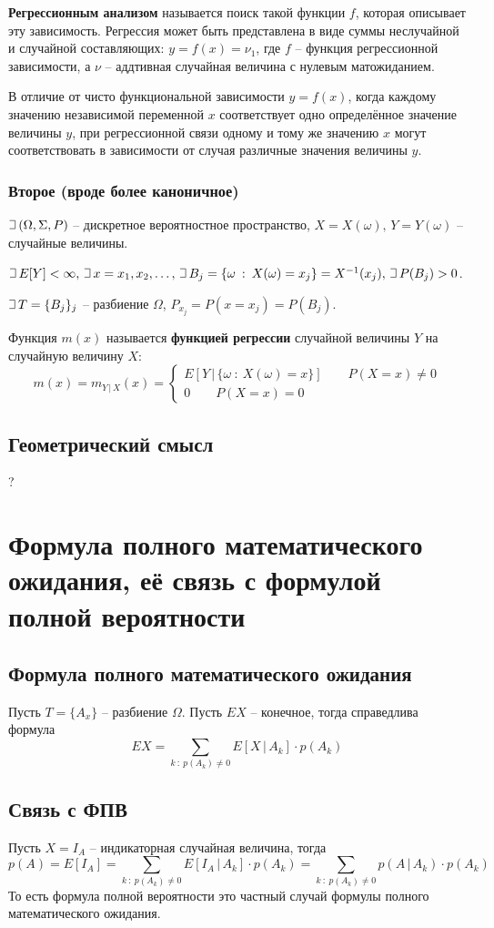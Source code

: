 \documentclass{article}
\def\letus{%
    \mathord{\setbox0=\hbox{$\exists$}%
             \hbox{\kern 0.125\wd0%
                   \vbox to \ht0{%
                      \hrule width 0.75\wd0%
                      \vfill%
                      \hrule width 0.75\wd0}%
                   \vrule height \ht0%
                   \kern 0.125\wd0}%
           }%
}
\begin{document}
\textbf{Регрессионным анализом}
называется поиск такой функции $f$, которая описывает эту зависимость. Регрессия может быть представлена в виде суммы неслучайной и случайной составляющих: $y=f(x)=\nu_1$, где $f$ -- функция регрессионной зависимости, а $\nu$ -- аддтивная случайная величина с нулевым матожиданием.

В отличие от чисто функциональной зависимости $y=f(x)$, когда каждому значению независимой переменной $x$ соответствует одно определённое значение величины $y$, при регрессионной связи одному и тому же значению $x$ могут соответствовать в зависимости от случая различные значения величины $y$.

\subsubsection{Второе (вроде более каноничное)}
$\letus \,(\Omega,\Sigma,P)$ -- дискретное вероятностное пространство, $X=X(\omega),\,Y=Y(\omega)$ -- случайные величины.

$\letus\, E[Y]<\infty,\,\letus\, x=x_1,x_2,\dots,\,\letus\,B_j=\{\omega\::\:X(\omega)=x_j\}=X^{-1}(x_j),\,\letus\,P(B_j)>0$.

$\letus\,T=\{B_j\}_j$ -- разбиение $\Omega$, $P_{x_j}=P(x=x_j)=P(B_j)$.

Функция $m(x)$ называется \textbf{функцией регрессии} случайной величины $Y$ на случайную величину $X$:
$$ m(x)=m_{Y\,|\,X}(x)=\begin{cases}
E[Y\,|\,\{\omega\::\:X(\omega)=x\}]\quad\quad P(X=x)\neq 0\\
0\quad\quad P(X=x)=0
\end{cases}$$

\subsection{Геометрический смысл}
?
\newpage
\section{Формула полного математического ожидания, её связь с формулой полной вероятности}
\subsection{Формула полного математического ожидания}
Пусть $T=\{A_x\}$ -- разбиение $\Omega$. Пусть $EX$ -- конечное, тогда справедлива формула
$$ EX=\sum_{k\::\:p(A_k)\neq 0} E[X\,|\,A_k]\cdot p(A_k) $$
\subsection{Связь с ФПВ}
Пусть $X=I_A$ -- индикаторная случайная величина, тогда $$p(A)=E[I_A]=\sum_{k\::\:p(A_k)\neq 0} E[I_A\,|\,A_k]\cdot p(A_k)=\sum_{k\::\:p(A_k)\neq 0} p(A\,|\,A_k)\cdot p(A_k)$$ То есть формула полной вероятности это частный случай формулы полного математического ожидания.
\newpage
\end{document}
